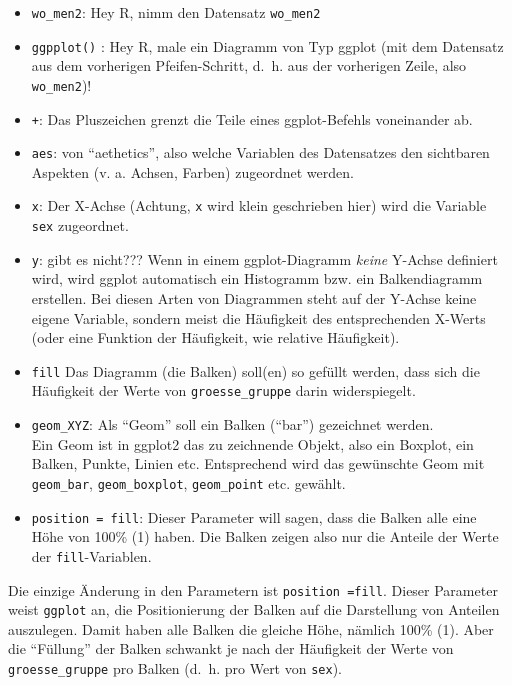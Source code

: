 \documentclass[12pt,ngerman,paper=a4,pagesize,DIV=13]{scrreprt}
\providecommand{\tightlist}{%
  \setlength{\itemsep}{0pt}\setlength{\parskip}{0pt}}
\begin{document}
\begin{itemize}
\tightlist
\item
  \texttt{wo\_men2}: Hey R, nimm den Datensatz \texttt{wo\_men2}
\item
  \texttt{ggpplot()} : Hey R, male ein Diagramm von Typ ggplot (mit dem
  Datensatz aus dem vorherigen Pfeifen-Schritt, d.~h. aus der vorherigen
  Zeile, also \texttt{wo\_men2})!
\item
  \texttt{+}: Das Pluszeichen grenzt die Teile eines ggplot-Befehls
  voneinander ab.
\item
  \texttt{aes}: von \enquote{aethetics}, also welche Variablen des
  Datensatzes den sichtbaren Aspekten (v. a. Achsen, Farben) zugeordnet
  werden.
\item
  \texttt{x}: Der X-Achse (Achtung, \texttt{x} wird klein geschrieben
  hier) wird die Variable \texttt{sex} zugeordnet.
\item
  \texttt{y}: gibt es nicht??? Wenn in einem ggplot-Diagramm
  \emph{keine} Y-Achse definiert wird, wird ggplot automatisch ein
  Histogramm bzw. ein Balkendiagramm erstellen. Bei diesen Arten von
  Diagrammen steht auf der Y-Achse keine eigene Variable, sondern meist
  die Häufigkeit des entsprechenden X-Werts (oder eine Funktion der
  Häufigkeit, wie relative Häufigkeit).\\
\item
  \texttt{fill} Das Diagramm (die Balken) soll(en) so gefüllt werden,
  dass sich die Häufigkeit der Werte von \texttt{groesse\_gruppe} darin
  widerspiegelt.\\
\item
  \texttt{geom\_XYZ}: Als \enquote{Geom} soll ein Balken (\enquote{bar})
  gezeichnet werden.\\
  Ein Geom ist in ggplot2 das zu zeichnende Objekt, also ein Boxplot,
  ein Balken, Punkte, Linien etc. Entsprechend wird das gewünschte Geom
  mit \texttt{geom\_bar}, \texttt{geom\_boxplot}, \texttt{geom\_point}
  etc. gewählt.\\
\item
  \texttt{position\ =\ fill}: Dieser Parameter will sagen, dass die
  Balken alle eine Höhe von 100\% (1) haben. Die Balken zeigen also nur
  die Anteile der Werte der \texttt{fill}-Variablen.
\end{itemize}

Die einzige Änderung in den Parametern ist
\texttt{position\ =\textquotesingle{}fill\textquotesingle{}}. Dieser
Parameter weist \texttt{ggplot} an, die Positionierung der Balken auf
die Darstellung von Anteilen auszulegen. Damit haben alle Balken die
gleiche Höhe, nämlich 100\% (1). Aber die \enquote{Füllung} der Balken
schwankt je nach der Häufigkeit der Werte von \texttt{groesse\_gruppe}
pro Balken (d.~h. pro Wert von \texttt{sex}).
\end{document}
